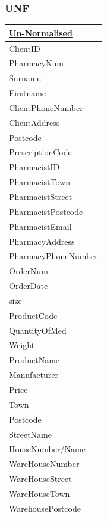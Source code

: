 \subsubsection{UNF}
\begin{table}[H]
\begin{tabular}{|l|}
\hline
\underline{Un-Normalised}\\
\hline
ClientID           \\
PharmacyNum        \\
Surname            \\
Firstname          \\
ClientPhoneNumber  \\
ClientAddress      \\
Postcode           \\
PrescriptionCode   \\
PharmacistID       \\
PharmacistTown     \\
PharmacistStreet   \\
PharmacistPostcode \\
PharmacistEmail    \\
PharmacyAddress    \\
PharmacyPhoneNumber\\
OrderNum           \\
OrderDate          \\
size               \\
ProductCode        \\
QuantityOfMed      \\
Weight             \\
ProductName        \\
Manufacturer       \\
Price              \\
Town               \\
Postcode           \\
StreetName         \\
HouseNumber/Name   \\
WareHouseNumber    \\
WareHouseStreet    \\
WareHouseTown\\
WarehousePostcode\\
\hline
\end{tabular}
\end{table}

